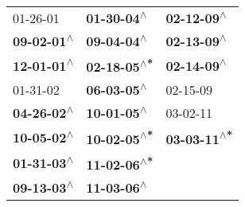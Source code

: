 \begin{supertabular}{lll}
                  01-26-01\textsuperscript{} &   \textbf{01-30-04\textsuperscript{$\wedge$}} &   \textbf{02-12-09\textsuperscript{$\wedge$}} \\
 \textbf{09-02-01\textsuperscript{$\wedge$}} &   \textbf{09-04-04\textsuperscript{$\wedge$}} &   \textbf{02-13-09\textsuperscript{$\wedge$}} \\
 \textbf{12-01-01\textsuperscript{$\wedge$}} &  \textbf{02-18-05\textsuperscript{$\wedge$*}} &   \textbf{02-14-09\textsuperscript{$\wedge$}} \\
                  01-31-02\textsuperscript{} &   \textbf{06-03-05\textsuperscript{$\wedge$}} &                    02-15-09\textsuperscript{} \\
 \textbf{04-26-02\textsuperscript{$\wedge$}} &   \textbf{10-01-05\textsuperscript{$\wedge$}} &                    03-02-11\textsuperscript{} \\
 \textbf{10-05-02\textsuperscript{$\wedge$}} &  \textbf{10-02-05\textsuperscript{$\wedge$*}} &  \textbf{03-03-11\textsuperscript{$\wedge$*}} \\
 \textbf{01-31-03\textsuperscript{$\wedge$}} &  \textbf{11-02-06\textsuperscript{$\wedge$*}} &                                               \\
 \textbf{09-13-03\textsuperscript{$\wedge$}} &   \textbf{11-03-06\textsuperscript{$\wedge$}} &                                               \\
\end{supertabular}

